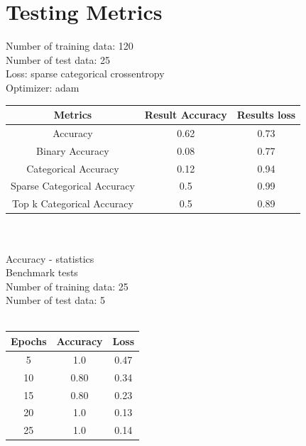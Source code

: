 \documentclass[a4papaer,12pt]{article}
\begin{document}
\section{Testing Metrics}
Number of training data: 120
\\
Number of test data: 25
\\
Loss: sparse categorical crossentropy
\\
Optimizer: adam
\\

\begin{tabular}{|c|c|c|}
	\hline
	Metrics & Result Accuracy & Results loss \\
	\hline
	Accuracy & 0.62 & 0.73 \\
	\hline
	Binary Accuracy & 0.08 & 0.77 \\
	\hline
	Categorical Accuracy & 0.12 & 0.94 \\
	\hline
	Sparse Categorical Accuracy & 0.5 & 0.99 \\	
	\hline
	Top k Categorical Accuracy & 0.5 & 0.89 \\
	\hline
\end{tabular}
\\\\
Accuracy - statistics
\\
Benchmark tests
\\
Number of training data: 25
\\
Number of test data: 5
\\
\\
\begin{tabular}{|c|c|c|}
	\hline
	Epochs & Accuracy & Loss \\
	\hline
	5 & 1.0 & 0.47 \\
	\hline
	10 & 0.80 & 0.34 \\
	\hline
	15 & 0.80 & 0.23 \\
	\hline
	20 & 1.0 & 0.13 \\	
	\hline
	25 & 1.0 & 0.14 \\
	\hline
\end{tabular}
\end{document}
